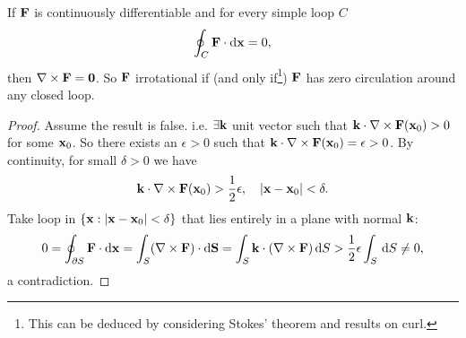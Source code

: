 \begin{proposition}
    If ${\bf F}$ is continuously differentiable and for every simple loop $C$ 
    \[
        \oint_{C} {\bf F} \cdot \mathrm{d}{\bf x} = 0,
    \]
    then $ \nabla\times {\bf F}=\mathbf{0} $. So ${\bf F}$ irrotational if (and only if\footnote{This can be deduced by considering Stokes' theorem and results on curl.}) ${\bf F}$ has zero circulation around any closed loop.
\end{proposition}
\begin{proof}
    Assume the result is false. i.e. $ \exists {\bf k} $ unit vector such that $ {\bf k} \cdot \nabla\times{\bf F}({\bf x}_0)>0 $ for some $ {\bf x}_0 $. So there exists an $\epsilon > 0$ such that $ {\bf k} \cdot \nabla\times{\bf F}({\bf x}_0)=\epsilon>0 $. By continuity, for small $ \delta>0 $ we have
    \[
        {\bf k} \cdot \nabla\times{\bf F}({\bf x}_0)>\frac{1}{2}\epsilon,\quad |{\bf x}-{\bf x}_0|<\delta.
    \]
    Take loop in $ \{{\bf x}:|{\bf x}-{\bf x}_0|<\delta\} $ that lies entirely in a plane with normal ${\bf k}$:
    \[
        0=\oint_{\partial S} {\bf F} \cdot\mathrm{d}\mathbf{x} = \int_{S} (\nabla\times{\bf F}) \cdot\mathrm{d}\mathbf{S} = \int_{S} {\bf k} \cdot (\nabla\times{\bf F}) \,\mathrm{d}S>\frac{1}{2}\epsilon \int_{S}  \,\mathrm{d}S\neq 0,
    \]
    a contradiction.
\end{proof}
